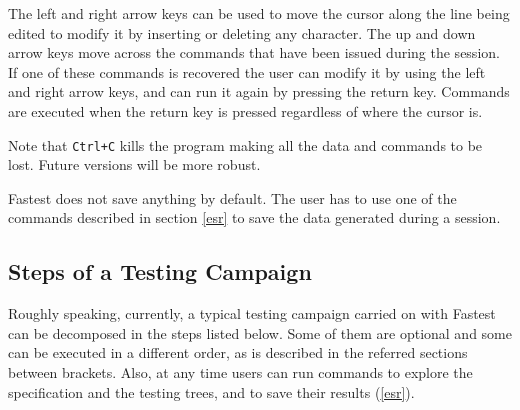 The left and right arrow keys can be used to move the cursor along the line being edited to modify it by inserting or deleting any character. The up and down arrow keys move across the commands that have been issued during the session. If one of these commands is recovered the user can modify it by using the left and right arrow keys, and can run it again by pressing the return key. Commands are executed when the return key is pressed regardless of where the cursor is.

\vspace{5mm} Note that \verb!Ctrl+C! kills the program making all the data and commands to be lost. Future versions will be more robust.

\vspace{5mm} Fastest does not save anything by default. The user has to use one of the commands described in section \ref{esr} to save the data generated during a session.

\subsection{Steps of a Testing Campaign}

Roughly speaking, currently, a typical testing campaign carried on with Fastest can be decomposed in the steps listed below. Some of them are optional and some can be executed in a different order, as is described in the referred sections between brackets. Also, at any time users can run commands to explore the specification and the testing trees, and to save their results (\ref{esr}). 

